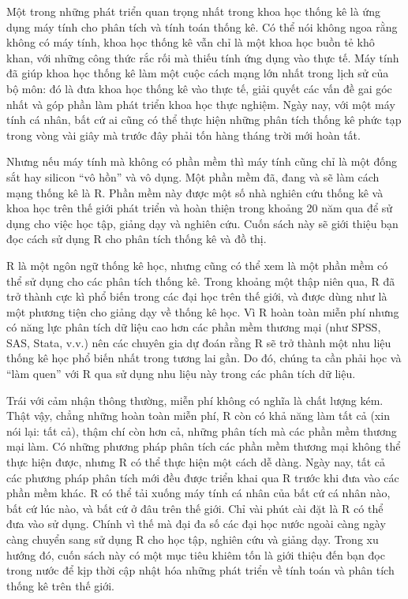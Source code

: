 \documentclass[
]{book}
\begin{document}
Một trong những phát triển quan trọng nhất trong khoa học thống kê là ứng dụng máy tính cho phân tích và tính toán thống kê. Có thể nói không ngoa rằng không có máy tính, khoa học thống kê vẫn chỉ là một khoa học buồn tẻ khô khan, với những công thức rắc rối mà thiếu tính ứng dụng vào thực tế. Máy tính đã giúp khoa học thống kê làm một cuộc cách mạng lớn nhất trong lịch sử của bộ môn: đó là đưa khoa học thống kê vào thực tế, giải quyết các vấn đề gai góc nhất và góp phần làm phát triển khoa học thực nghiệm. Ngày nay, với một máy tính cá nhân, bất cứ ai cũng có thể thực hiện những phân tích thống kê phức tạp trong vòng vài giây mà trước đây phải tốn hàng tháng trời mới hoàn tất.

Nhưng nếu máy tính mà không có phần mềm thì máy tính cũng chỉ là một đống sắt hay silicon ``vô hồn'' và vô dụng. Một phần mềm đã, đang và sẽ làm cách mạng thống kê là R. Phần mềm này được một số nhà nghiên cứu thống kê và khoa học trên thế giới phát triển và hoàn thiện trong khoảng 20 năm qua để sử dụng cho việc học tập, giảng dạy và nghiên cứu. Cuốn sách này sẽ giới thiệu bạn đọc cách sử dụng R cho phân tích thống kê và đồ thị.

R là một ngôn ngữ thống kê học, nhưng cũng có thể xem là một phần mềm có thể sử dụng cho các phân tích thống kê. Trong khoảng một thập niên qua, R đã trở thành cực kì phổ biến trong các đại học trên thế giới, và được dùng như là một phương tiện cho giảng dạy về thống kê học. Vì R hoàn toàn miễn phí nhưng có năng lực phân tích dữ liệu cao hơn các phần mềm thương mại (như SPSS, SAS, Stata, v.v.) nên các chuyên gia dự đoán rằng R sẽ trở thành một nhu liệu thống kê học phổ biến nhất trong tương lai gần. Do đó, chúng ta cần phải học và ``làm quen'' với R qua sử dụng nhu liệu này trong các phân tích dữ liệu.

Trái với cảm nhận thông thường, miễn phí không có nghĩa là chất lượng kém. Thật vậy, chẳng những hoàn toàn miễn phí, R còn có khả năng làm tất cả (xin nói lại: tất cả), thậm chí còn hơn cả, những phân tích mà các phần mềm thương mại làm. Có những phương pháp phân tích các phần mềm thương mại không thể thực hiện được, nhưng R có thể thực hiện một cách dễ dàng. Ngày nay, tất cả các phương pháp phân tích mới đều được triển khai qua R trước khi đưa vào các phần mềm khác. R có thể tải xuống máy tính cá nhân của bất cứ cá nhân nào, bất cứ lúc nào, và bất cứ ở đâu trên thế giới. Chỉ vài phút cài đặt là R có thể đưa vào sử dụng. Chính vì thế mà đại đa số các đại học nước ngoài càng ngày càng chuyển sang sử dụng R cho học tập, nghiên cứu và giảng dạy. Trong xu hướng đó, cuốn sách này có một mục tiêu khiêm tốn là giới thiệu đến bạn đọc trong nước để kịp thời cập nhật hóa những phát triển về tính toán và phân tích thống kê trên thế giới.
\end{document}
